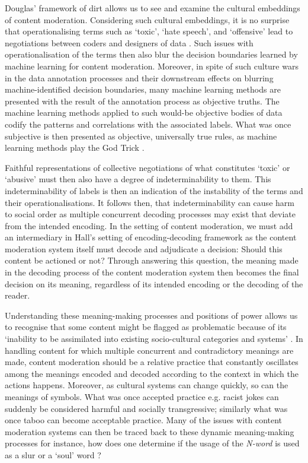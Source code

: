 Douglas' framework of dirt allows us to see and examine the cultural embeddings of content moderation. 
Considering such cultural embeddings, it is no surprise that operationalising terms such as `toxic', `hate speech', and `offensive' lead to negotiations between coders and designers of data \cite{Waseem:2016}. 
Such issues with operationalisation of the terms then also blur the decision boundaries learned by machine learning for content moderation. 
Moreover, in spite of such culture wars in the data annotation processes and their downstream effects on blurring machine-identified decision boundaries, many machine learning methods are presented with the result of the annotation process as objective truths. 
The machine learning methods applied to such would-be objective bodies of data codify the patterns and correlations with the associated labels. 
What was once subjective is then presented as objective, universally true rules, as machine learning methods play the God Trick \citep{Haraway:1988}.\vspace{5mm}

Faithful representations of collective negotiations of what constitutes `toxic' or `abusive' must then also have a degree of indeterminability to them. 
This indeterminability of labels is then an indication of the instability of the terms and their operationalisations.
It follows then, that indeterminability can cause harm to social order \cite{Hall:floating:1997} as multiple concurrent decoding processes may exist that deviate from the intended encoding. 
In the setting of content moderation, we must add an intermediary in Hall's \cite{Hall:1997} setting of encoding-decoding framework as the content moderation system itself must decode and adjudicate a decision: Should this content be actioned or not? 
Through answering this question, the meaning made in the decoding process of the content moderation system then becomes the final decision on its meaning, regardless of its intended encoding or the decoding of the reader.

Understanding these meaning-making processes and positions of power allows us to recognise that some content might be flagged as problematic because of its `inability to be assimilated into existing socio-cultural categories and systems' \cite{Rafi:2019}. 
In handling content for which multiple concurrent and contradictory meanings are made, content moderation should be a relative practice that constantly oscillates among the meanings encoded and decoded according to the context in which the actions happens. 
Moreover, as cultural systems can change quickly, so can the meanings of symbols. 
What was once accepted practice e.g. racist jokes can suddenly be considered harmful and socially transgressive; similarly what was once taboo can become acceptable practice.
Many of the issues with content moderation systems can then be traced back to these dynamic meaning-making processes for instance, how does one determine if the usage of the \textit{N-word} is used as a slur or a `soul' word \cite{Rahman:2012}?\vspace{5mm}

